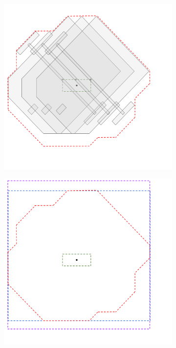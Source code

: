 \begin{figure}[htp]
    \begin{subfigure}{0.4\textwidth}
        \centering
        \includegraphics[width=\linewidth]{figures/samp/CC3.png}
        \caption{}
        \vspace{-0.3cm}
        \label{fig:CC3}
    \end{subfigure}
    \begin{subfigure}{0.4\textwidth}
        \centering
        \includegraphics[width=\linewidth]{figures/samp/CCall.png}
        \caption{}
        \vspace{-0.3cm}
        \label{fig:CCall}
    \end{subfigure}


\end{figure}
